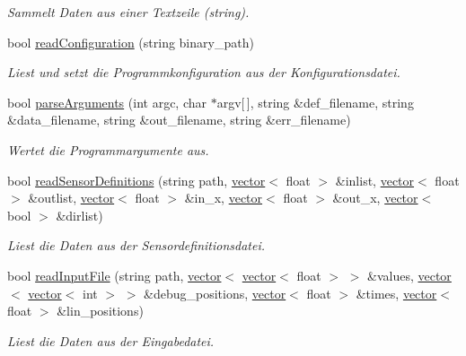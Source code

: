 \begin{DoxyCompactItemize}
\begin{DoxyCompactList}\small\item\em Sammelt Daten aus einer Textzeile (string). \end{DoxyCompactList}\item 
bool \hyperlink{classOdisiToSdConverter_a8c6bc01ae2c063d89dc64c0a7d68c033}{read\-Configuration} (string binary\-\_\-path)
\begin{DoxyCompactList}\small\item\em Liest und setzt die Programmkonfiguration aus der Konfigurationsdatei. \end{DoxyCompactList}\item 
bool \hyperlink{classOdisiToSdConverter_ac8d40f3edad9af5004d516809e0e40a2}{parse\-Arguments} (int argc, char $\ast$argv\mbox{[}$\,$\mbox{]}, string \&def\-\_\-filename, string \&data\-\_\-filename, string \&out\-\_\-filename, string \&err\-\_\-filename)
\begin{DoxyCompactList}\small\item\em Wertet die Programmargumente aus. \end{DoxyCompactList}\item 
bool \hyperlink{classOdisiToSdConverter_a8db961a716d43b3d4de4f2e4e19b0706}{read\-Sensor\-Definitions} (string path, \hyperlink{classstd_1_1vector}{vector}$<$ float $>$ \&inlist, \hyperlink{classstd_1_1vector}{vector}$<$ float $>$ \&outlist, \hyperlink{classstd_1_1vector}{vector}$<$ float $>$ \&in\-\_\-x, \hyperlink{classstd_1_1vector}{vector}$<$ float $>$ \&out\-\_\-x, \hyperlink{classstd_1_1vector}{vector}$<$ bool $>$ \&dirlist)
\begin{DoxyCompactList}\small\item\em Liest die Daten aus der Sensordefinitionsdatei. \end{DoxyCompactList}\item 
bool \hyperlink{classOdisiToSdConverter_a270932ed908757ac477370eef64db442}{read\-Input\-File} (string path, \hyperlink{classstd_1_1vector}{vector}$<$ \hyperlink{classstd_1_1vector}{vector}$<$ float $>$ $>$ \&values, \hyperlink{classstd_1_1vector}{vector}$<$ \hyperlink{classstd_1_1vector}{vector}$<$ int $>$ $>$ \&debug\-\_\-positions, \hyperlink{classstd_1_1vector}{vector}$<$ float $>$ \&times, \hyperlink{classstd_1_1vector}{vector}$<$ float $>$ \&lin\-\_\-positions)
\begin{DoxyCompactList}\small\item\em Liest die Daten aus der Eingabedatei. \end{DoxyCompactList}\item 

\end{DoxyCompactItemize}
